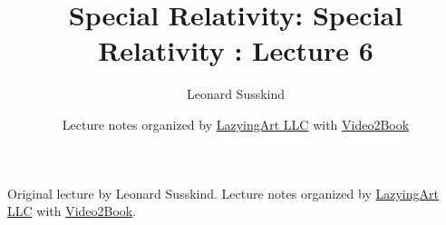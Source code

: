 \documentclass[11pt,oneside]{book}
\begin{document}
\frontmatter
\title{Special Relativity: Special Relativity : Lecture 6}
\author{Leonard Susskind}
\date{Lecture notes organized by \href{https://lazying.art}{LazyingArt LLC} with \href{https://github.com/lachlanchen/Video2Book}{Video2Book}}
\maketitle
\begin{center}
\small Original lecture by Leonard Susskind. Lecture notes organized by \href{https://lazying.art}{LazyingArt LLC} with \href{https://github.com/lachlanchen/Video2Book}{Video2Book}.
\end{center}
\clearpage
\mainmatter

\end{document}
